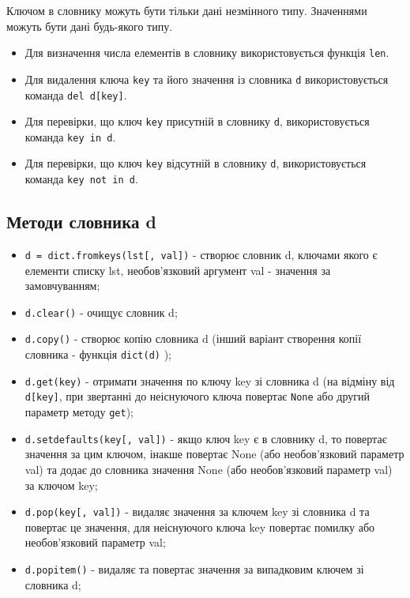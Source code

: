 \begin{frame}
Ключом в словнику можуть бути тільки дані незмінного типу. Значеннями можуть бути дані будь-якого типу.

\begin{itemize}
  \item Для визначення числа елементів в словнику використовується функція \texttt{len}.
  
  \item Для видалення ключа \texttt{key} та його значення із словника \texttt{d} використовується команда \texttt{del d[key]}.
  \item Для перевірки, що ключ \texttt{key} присутній в словнику \texttt{d}, використовується команда \texttt{key in d}.
  \item Для перевірки, що ключ \texttt{key} відсутній в словнику \texttt{d}, використовується команда \texttt{key not in d}.
\end{itemize}
\end{frame}

\subsection{Методи словника d} 
\begin{frame}
    \begin{itemize}
        \item<1-> \texttt{d = dict.fromkeys(lst[, val])} - створює словник d, ключами якого є елементи списку lst, необов'язковий аргумент val - значення за замовчуванням;
        \item<2-> \texttt{d.clear()} - очищує словник d;
        \item<3-> \texttt{d.copy()} - створює копію словника d (інший варіант створення копії словника - функція \texttt{dict(d)} );
        \item<4-> \texttt{d.get(key)} - отримати значення по ключу key зі словника d (на відміну від \texttt{d[key]}, при звертанні до неіснуючого ключа повертає \texttt{None} або другий параметр методу \texttt{get});
    \end{itemize}
\end{frame}

\begin{frame}
    \begin{itemize}
        \item<1-> \texttt{d.setdefaults(key[, val])} - якщо ключ key є в словнику d, то повертає значення за цим ключом, інакше повертає None (або необов'язковий параметр val) та додає до словника значення None (або необов'язковий параметр val) за ключом key;
        \item<2-> \texttt{d.pop(key[, val])} - видаляє значення за ключем key зі словника d та повертає це значення, для неіснуючого ключа key повертає помилку або необов'язковий параметр val;
        \item<3-> \texttt{d.popitem()} - видаляє та повертає значення за випадковим ключем зі словника d;
    \end{itemize}
\end{frame}

